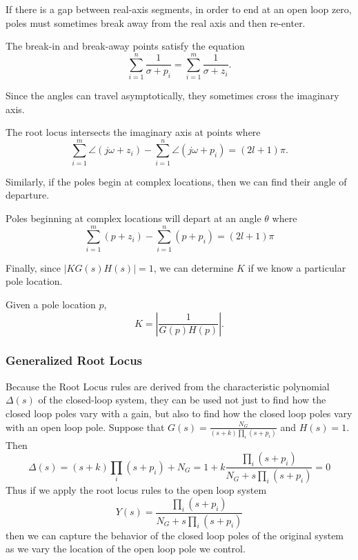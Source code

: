 If there is a gap between real-axis segments, in order to end at an open loop zero, poles must sometimes break away from the real axis and then re-enter.
\begin{theorem}
  The break-in and break-away points satisfy the equation
  \[
	\sum_{i=1}^n \frac{1}{\sigma + p_i} = \sum_{i=1}^m \frac{1}{\sigma+z_i}.
  \]
  \label{thm:rl-six}
\end{theorem}
Since the angles can travel asymptotically, they sometimes cross the imaginary axis.
\begin{theorem}
  The root locus intersects the imaginary axis at points where \[
	\sum_{i=1}^m \angle (j\omega + z_i) - \sum_{i=1}^n \angle (j\omega + p_i) = (2l+1)\pi.
  \]
  \label{thm:rl-seven}
\end{theorem}
Similarly, if the poles begin at complex locations, then we can find their angle of departure.
\begin{theorem}
  Poles beginning at complex locations will depart at an angle $\theta$ where \[
	\sum_{i=1}^m (p + z_i) - \sum_{i=1}^n (p + p_i) = (2l+1)\pi
  \]

  \label{thm:rl-eight}
\end{theorem}
Finally, since $|KG(s)H(s)|=1$, we can determine $K$ if we know a particular pole location.
\begin{theorem}
  Given a pole location $p$,
  \[
	K = \left|\frac{1}{G(p)H(p)}\right|.
  \]
  \label{thm:rl-nine}
\end{theorem}
\subsubsection{Generalized Root Locus}
Because the Root Locus rules are derived from the characteristic polynomial $\Delta(s)$ of the closed-loop system, they can be used not just to find how the closed loop poles vary with a gain, but also to find how the closed loop poles vary with an open loop pole.
Suppose that $G(s) = \frac{N_G}{(s+k)\prod_i(s+p_i)}$ and $H(s) = 1$. Then
\[
  \Delta(s) = (s+k)\prod_i(s+p_i) + N_G = 1 + k\frac{\prod_i (s+p_i) }{N_G + s\prod_i(s+p_i)} = 0
\]
Thus if we apply the root locus rules to the open loop system
\[
  Y(s) = \frac{\prod_i (s+p_i) }{N_G + s\prod_i(s+p_i)}
\]
then we can capture the behavior of the closed loop poles of the original system as we vary the location of the open loop pole we control.
